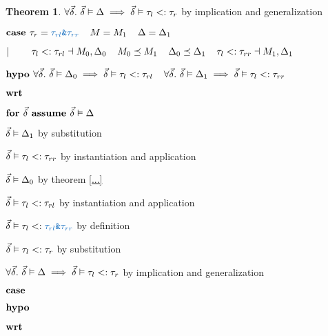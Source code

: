 \documentclass[acmsmall]{acmart}
\theoremstyle{definition}
\newtheorem{theorem}{Theorem}[section]
\begin{document}
\begin{theorem}
      \item \Z\Z $\forall \vec{\delta} .\ \vec{\delta} \vDash \Delta \implies \vec{\delta} \vDash \tau_l <: \tau_r$ 
      by implication and generalization

    \item \Z $\B{case } 
      \tau_r = \obj{$\tau_{rl}$\&$\tau_{rr}$}
      \I
      M = M_1
      \I
      \Delta = \Delta_1
    $
    \item \Z $|\ \ \ \ \ \ \  
      \tau_l <: \tau_{rl} \dashv M_0, \Delta_0
      \hspace{4mm}
      M_0 \preceq M_1
      \hspace{4mm}
      \Delta_0 \preceq \Delta_1
      \hspace{4mm}
      \tau_l <: \tau_{rr} \dashv M_1, \Delta_1
    $
    \item \Z $\textbf{hypo } 
      \forall \vec{\delta} .\ \vec{\delta} \vDash \Delta_0 \implies \vec{\delta} \vDash \tau_l <: \tau_{rl} 
      \hspace{4mm}
      \forall \vec{\delta} .\ \vec{\delta} \vDash \Delta_1 \implies \vec{\delta} \vDash \tau_l <: \tau_{rr} 
    $
    \item \Z $\textbf{wrt } $
      \item \Z\Z $\textbf{for } \vec{\delta} \textbf{ assume } \vec{\delta} \vDash \Delta$
        \item \Z\Z\Z $\vec{\delta} \vDash \Delta_1 $ by substitution
        \item \Z\Z\Z $\vec{\delta} \vDash \tau_l <: \tau_{rr}$ by instantiation and application 
        \item \Z\Z\Z $\vec{\delta} \vDash \Delta_0 $ by theorem \ref{...}  
        \item \Z\Z\Z $\vec{\delta} \vDash \tau_l <: \tau_{rl}$ by instantiation and application 
        \item \Z\Z\Z $\vec{\delta} \satisfies \tau_l \subtypes \obj{$\tau_{rl}$\&$\tau_{rr}$}$ by definition 
        \item \Z\Z\Z $\vec{\delta} \vDash \tau_l <: \tau_r$ by substitution
      \item \Z\Z $\forall \vec{\delta} .\ \vec{\delta} \vDash \Delta \implies \vec{\delta} \vDash \tau_l <: \tau_r$ 
      by implication and generalization


    \item \Z $\textbf{case } $
    \item \Z $\textbf{hypo } $
    \item \Z $\textbf{wrt } $
      \item \Z\Z {} 


\end{theorem}
\end{document}

